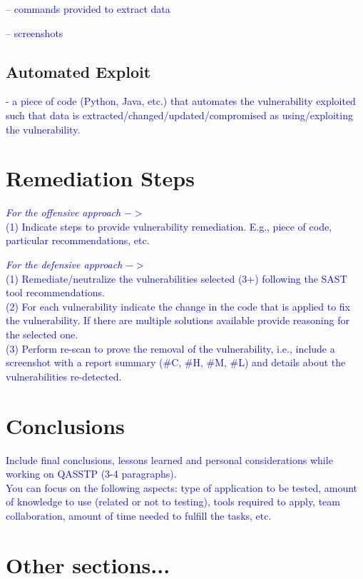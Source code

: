 \documentclass{article}
\begin{document}
\textcolor{blue}{-- commands provided to extract data}

\textcolor{blue}{-- screenshots}


\subsection{Automated Exploit}
\label{}
\textcolor{blue}{- a piece of code (Python, Java, etc.) that automates the vulnerability exploited such that data is extracted/changed/updated/compromised as using/exploiting the vulnerability.}



\section{Remediation Steps}
\label{}

\textcolor{blue}{\textit{For the offensive approach} $->$\\
(1) Indicate steps to provide vulnerability remediation. E.g., piece of code, particular recommendations, etc.}

\textcolor{blue}{\textit{For the defensive approach} $->$\\
(1) Remediate/neutralize the vulnerabilities selected (3+) following the SAST tool recommendations.}\\
\textcolor{blue}{(2) For each vulnerability indicate the change in the code that is applied to fix the vulnerability. If there are multiple solutions available provide reasoning for the selected one.} \\
\textcolor{blue}{(3) Perform re-scan to prove the removal of the vulnerability, i.e., include a screenshot with a report summary (\#C, \#H, \#M, \#L) and details about the vulnerabilities re-detected.}

\section{Conclusions}
\label{}

\textcolor{blue}{Include final conclusions, lessons learned and personal considerations while working on QASSTP (3-4 paragraphs).\\
You can focus on the following aspects: type of application to be tested, amount of knowledge to use (related or not to testing), tools required to apply, team collaboration, amount of time needed to fulfill the tasks, etc.}

\section{Other sections...}
\end{document}

